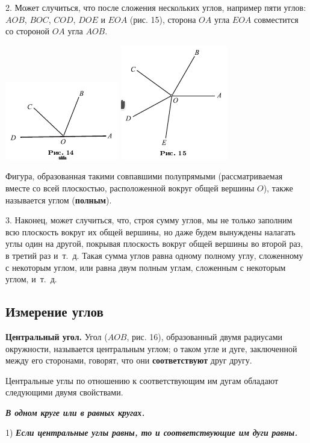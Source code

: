 \documentclass[oneside]{book}
\begin{document}
2.
Может случиться, что после сложения нескольких углов, например пяти углов:
$AOB$, $BOC$, $COD$, $DOE$ и $EOA$ (рис. 15), сторона $OA$ угла $EOA$ совместится со стороной $OA$ угла $AOB$.

\includegraphics{pics/ris-14}
\includegraphics{pics/ris-15}

Фигура, образованная такими совпавшими полупрямыми (рассматриваемая вместе со всей плоскостью, расположенной вокруг общей вершины $O$), также называется углом (\textbf{полным}).


3.
Наконец, может случиться, что, строя сумму углов, мы не только заполним всю плоскость вокруг их общей вершины, но даже будем вынуждены налагать углы один на другой, покрывая плоскость вокруг общей вершины во второй раз, в третий раз и~т.~д.
Такая сумма углов равна одному полному углу, сложенному с некоторым углом, или равна двум полным углам, сложенным с некоторым углом, и~т.~д.

\subsection*{Измерение углов}

\textbf{Центральный угол.}
Угол ($AOB$, рис. 16), образованный двумя радиусами окружности, называется центральным углом;
о таком угле и дуге, заключенной между его сторонами, говорят, что они \textbf{соответствуют} друг другу.

Центральные углы по отношению к соответствующим им дугам обладают следующими двумя свойствами.

\textbf{\emph{В одном круге или в равных кругах.}}

1) \textbf{\emph{Если центральные углы равны, то и соответствующие им дуги равны.}}
\end{document}
